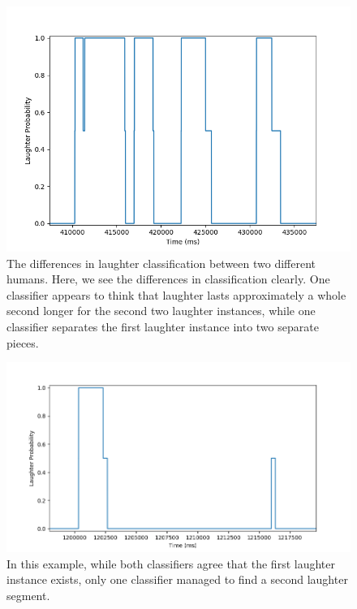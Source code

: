 \documentclass[a4paper,11pt,notitlepage]{article}
\begin{document}
\begin{figure}[H]
	\centering
	\vspace{0.5cm}
	\includegraphics[scale = 0.75]{figs/differences_1.png}
	\caption{The differences in laughter classification between two different humans. Here, we see the differences in classification clearly. One classifier appears to think that laughter lasts approximately a whole second longer for the second two laughter instances, while one classifier separates the first laughter instance into two separate pieces.}
	\label{laughter_classification_differences_1}
\end{figure}
\begin{figure}[H]
	\centering
	\vspace{0.5cm}
	\includegraphics[scale = 0.7]{figs/differences_2.png}
	\caption{In this example, while both classifiers agree that the first laughter instance exists, only one classifier managed to find a second laughter segment.}
	\label{laughter_classification_differences_2}
\end{figure}
\end{document}
